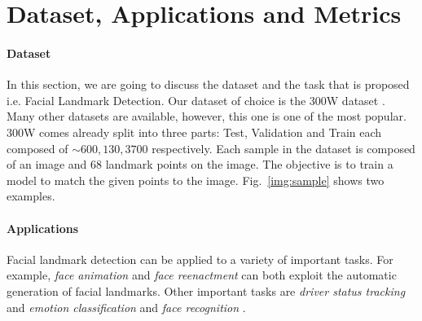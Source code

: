 \section{Dataset, Applications and Metrics}\label{sects:dataset}
\paragraph{Dataset}
In this section, we are going to discuss the dataset and the task that is proposed i.e. Facial Landmark Detection. Our dataset of choice is the 300W dataset \cite{Sagonas13a,Sagonas13b,Sagonas16}. Many other datasets are available, however, this one is one of the most popular. 300W comes already split into three parts: Test, Validation and Train each composed of $\sim 600,130,3700$ respectively. Each sample in the dataset is composed of an image and 68 landmark points on the image. The objective is to train a model to match the given points to the image. Fig.~\ref{img:sample} shows two examples.

\paragraph{Applications}
Facial landmark detection can be applied to a variety of important tasks. For example, \textit{face animation} and \textit{face reenactment} can both exploit the automatic generation of facial landmarks. Other important tasks are \textit{driver status tracking} and \textit{emotion classification} and \textit{face recognition} \cite{Khabarlak21}.

